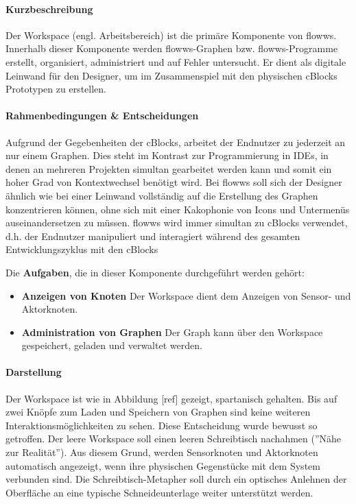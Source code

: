 \paragraph{Kurzbeschreibung} Der Workspace (engl. Arbeitsbereich) ist die primäre Komponente von flowws. Innerhalb dieser Komponente werden flowws-Graphen bzw. flowws-Programme erstellt, organisiert, administriert und auf Fehler untersucht. Er dient als digitale Leinwand für den Designer, um im Zusammenspiel mit den physischen cBlocks Prototypen zu erstellen.

\paragraph{Rahmenbedingungen \& Entscheidungen} Aufgrund der Gegebenheiten der cBlocks, arbeitet der Endnutzer zu jederzeit an nur einem Graphen. Dies steht im Kontrast zur Programmierung in \acp{IDE}, in denen an mehreren Projekten simultan gearbeitet werden kann und somit ein hoher Grad von Kontextwechsel benötigt wird. Bei flowws soll sich der Designer ähnlich wie bei einer Leinwand vollständig auf die Erstellung des Graphen konzentrieren können, ohne sich mit einer Kakophonie von Icons und Untermenüs auseinandersetzen zu müssen. flowws wird immer simultan zu cBlocks verwendet, d.h. der Endnutzer manipuliert und interagiert während des gesamten Entwicklungszyklus mit den cBlocks

Die \textbf{Aufgaben}, die in dieser Komponente durchgeführt werden gehört: 
\begin{itemize}
    \item \textbf{Anzeigen von Knoten} Der Workspace dient dem Anzeigen von Sensor- und Aktorknoten. 
    \item \textbf{Administration von Graphen} Der Graph kann über den Workspace gespeichert, geladen und verwaltet werden. 
\end{itemize}

\paragraph{Darstellung} Der Workspace ist wie in Abbildung [ref] gezeigt, spartanisch gehalten. Bis auf zwei Knöpfe zum Laden und Speichern von Graphen sind keine weiteren Interaktionsmöglichkeiten zu sehen. Diese Entscheidung wurde bewusst so getroffen. Der leere Workspace soll einen leeren Schreibtisch nachahmen (''Nähe zur Realität''). Aus diesem Grund, werden Sensorknoten und Aktorknoten automatisch angezeigt, wenn ihre physischen Gegenstücke mit dem System verbunden sind. Die Schreibtisch-Metapher soll durch ein optisches Anlehnen der Oberfläche an eine typische Schneideunterlage weiter unterstützt werden.

